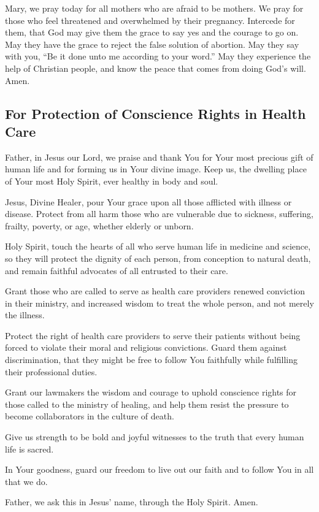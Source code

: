 \documentclass[12pt]{article}
\newcommand{\prayertitle}[1]{\subsection{#1}}
\begin{document}
Mary, we pray today for all mothers who are afraid to be mothers.
We pray for those who feel threatened and overwhelmed by their pregnancy.
Intercede for them, that God may give them the grace to say yes and the courage to go on.
May they have the grace to reject the false solution of abortion.
May they say with you, ``Be it done unto me according to your word.''
May they experience the help of Christian people, and know the peace that comes from doing God's will.
Amen.

\prayertitle{For Protection of Conscience Rights in Health Care}
Father, in Jesus our Lord, we praise and thank You for Your most precious gift of human life and for forming us in Your divine image.
Keep us, the dwelling place of Your most Holy Spirit, ever healthy in body and soul.

Jesus, Divine Healer, pour Your grace upon all those afflicted with illness or disease.
Protect from all harm those who are vulnerable due to sickness, suffering, frailty, poverty, or age, whether elderly or unborn.

Holy Spirit, touch the hearts of all who serve human life in medicine and science, so they will protect the dignity of each person, from conception to natural death, and remain faithful advocates of all entrusted to their care.  

Grant those who are called to serve as health care providers renewed conviction in their ministry, and increased wisdom to treat the whole person, and not merely the illness.

Protect the right of health care providers to serve their patients without being forced to violate their moral and religious convictions.
Guard them against discrimination, that they might be free to follow You faithfully while fulfilling their professional duties.

Grant our lawmakers the wisdom and courage to uphold conscience rights for those called to the ministry of healing, and help them resist the pressure to become collaborators in the culture of death.

Give us strength to be bold and joyful witnesses to the truth that every human life is sacred.

In Your goodness, guard our freedom to live out our faith and to follow You in all that we do.

Father, we ask this in Jesus’ name, through the Holy Spirit. Amen.
\end{document}
